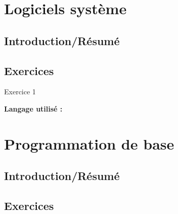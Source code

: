\section{Logiciels système}

\subsection{Introduction/Résumé}

\subsection{Exercices}

\begin{Exercice}[Durée] Exercice 1\\

\begin{conseil}
\end{conseil}
    
\begin{solution}
\textbf{Langage utilisé :}
    
\end{solution}

\end{Exercice}

\section{Programmation de base}

\subsection{Introduction/Résumé}

\subsection{Exercices}
    
